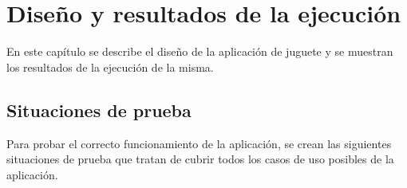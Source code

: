 \chapter{Diseño y resultados de la ejecución}
En este capítulo se describe el diseño de la aplicación de juguete
y se muestran los resultados de la ejecución de la misma.

\section{Situaciones de prueba}
Para probar el correcto funcionamiento de la aplicación,
se crean las siguientes situaciones de prueba que tratan de cubrir
todos los casos de uso posibles de la aplicación.

